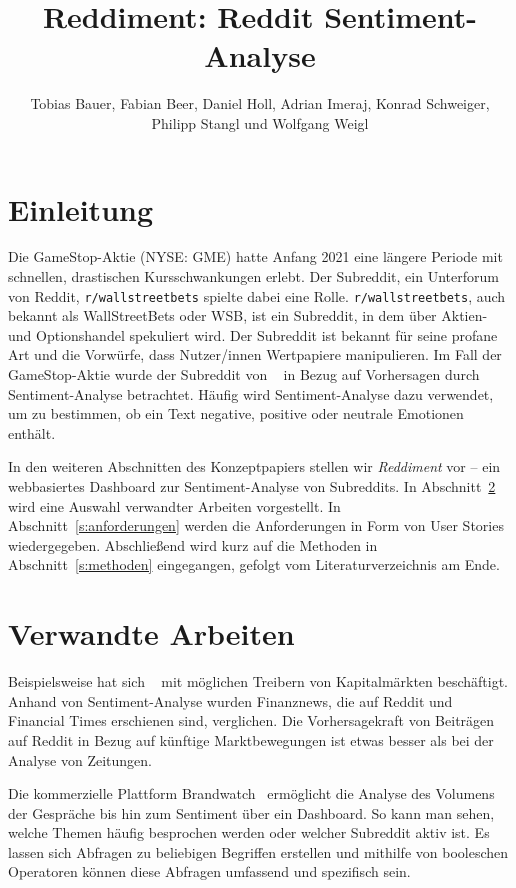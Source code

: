 \documentclass[a4paper, 10pt, conference]{ieeeconf}
\title{\LARGE \bf
Reddiment: Reddit Sentiment-Analyse
}
\author{Tobias Bauer, Fabian Beer,  Daniel Holl,  Adrian Imeraj,  Konrad Schweiger,  Philipp Stangl und Wolfgang Weigl
}
\begin{document}
\maketitle
\thispagestyle{empty}
\pagestyle{empty}

\section{Einleitung}

Die GameStop-Aktie (NYSE: GME) hatte Anfang 2021 eine längere Periode mit schnellen, drastischen Kursschwankungen erlebt. Der Subreddit,  ein Unterforum von Reddit,  \texttt{r/wallstreetbets} spielte dabei eine Rolle. \texttt{r/wallstreetbets}, auch bekannt als WallStreetBets oder WSB, ist ein Subreddit, in dem über Aktien- und Optionshandel spekuliert wird.  Der Subreddit ist bekannt für seine profane Art und die Vorwürfe, dass Nutzer/innen Wertpapiere manipulieren. Im Fall der GameStop-Aktie wurde der Subreddit von \citeauthor{wang2021}~\cite{wang2021} in Bezug auf Vorhersagen durch Sentiment-Analyse betrachtet. Häufig wird Sentiment-Analyse dazu verwendet, um zu bestimmen, ob ein Text negative, positive oder neutrale Emotionen enthält.

In den weiteren Abschnitten des Konzeptpapiers stellen wir \textit{Reddiment} vor -- ein webbasiertes Dashboard zur Sentiment-Analyse von Subreddits. In Abschnitt~\ref{s:verwandte_arbeiten} wird eine Auswahl verwandter Arbeiten vorgestellt.  In Abschnitt~\ref{s:anforderungen} werden die Anforderungen in Form von User Stories wiedergegeben.  Abschließend wird kurz auf die Methoden in Abschnitt~\ref{s:methoden} eingegangen, gefolgt vom Literaturverzeichnis am Ende.

\section{Verwandte Arbeiten} \label{s:verwandte_arbeiten}

Beispielsweise hat sich \citeauthor{lubitz2017}~\cite{lubitz2017} mit möglichen Treibern von Kapitalmärkten beschäftigt. Anhand von Sentiment-Analyse wurden Finanznews, die auf Reddit und Financial Times erschienen sind, verglichen. Die Vorhersagekraft von Beiträgen auf Reddit in Bezug auf künftige Marktbewegungen ist etwas besser als bei der Analyse von Zeitungen.

Die kommerzielle Plattform Brandwatch~\cite{brandwatch} ermöglicht die Analyse des Volumens der Gespräche bis hin zum Sentiment über ein Dashboard. So kann man sehen, welche Themen häufig besprochen werden oder welcher Subreddit aktiv ist. Es lassen sich Abfragen zu beliebigen Begriffen erstellen und mithilfe von booleschen Operatoren können diese Abfragen umfassend und spezifisch sein.
\end{document}

